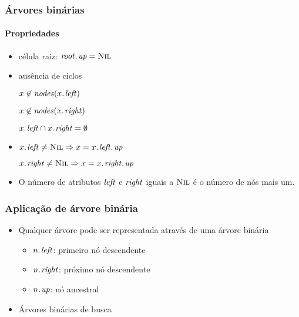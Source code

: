 \documentclass{beamer}
\begin{document}
\begin{frame}

  \frametitle{Árvores binárias}
  \framesubtitle{Propriedades}

  \begin{itemize}

  \item célula raiz: $\attrib{\id{root}}{up} = \const{Nil}$

  \item ausência de ciclos

    $x \not\in \id{nodes}(\attrib{x}{left})$
    
    $x \not\in \id{nodes}(\attrib{x}{right})$
    
    $\attrib{x}{left} \cap \attrib{x}{right} = \emptyset$

  \item $\attrib{x}{left} \neq \const{Nil} \Rightarrow 
    x = \attrib{\attrib{x}{left}}{up}$

    $\attrib{x}{right} \neq \const{Nil} \Rightarrow 
    x = \attrib{\attrib{x}{right}}{up}$
        

  \item O número de atributos $\id{left}$ e $\id{right}$
    iguais a $\textnormal{\scshape Nil}$ é o número de nós mais um.
  \end{itemize}

\end{frame}

\begin{frame}

\frametitle{Aplicação de árvore binária}

\begin{itemize}

  \item Qualquer árvore pode ser representada através de uma árvore binária

    \begin{itemize}

      \item $\attrib{n}{left}$: primeiro nó descendente

      \item $\attrib{n}{right}$: próximo nó descendente

      \item $\attrib{n}{up}$: nó ancestral

    \end{itemize}

  \item Árvores binárias de busca

\end{itemize}

\end{frame}
\end{document}
